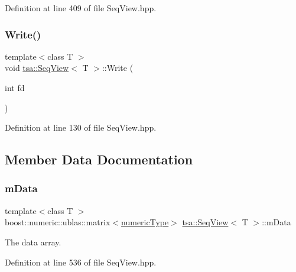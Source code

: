 Definition at line 409 of file Seq\+View.\+hpp.

\mbox{\label{classtsa_1_1_seq_view_a018ca56daa37e8b8ae58c8cc978ddc9b}} 
\subsubsection{\texorpdfstring{Write()}{Write()}}
{\footnotesize\ttfamily template$<$class T $>$ \\
void \hyperlink{classtsa_1_1_seq_view}{tsa\+::\+Seq\+View}$<$ T $>$\+::Write (\begin{DoxyParamCaption}\item[{int}]{fd }\end{DoxyParamCaption})\hspace{0.3cm}{\ttfamily [inline]}}



Definition at line 130 of file Seq\+View.\+hpp.



\subsection{Member Data Documentation}
\mbox{\label{classtsa_1_1_seq_view_a7534776ab98f82620fd02d021309251a}} 
\subsubsection{\texorpdfstring{m\+Data}{mData}}
{\footnotesize\ttfamily template$<$class T $>$ \\
boost\+::numeric\+::ublas\+::matrix$<$\hyperlink{classtsa_1_1_seq_view_a72b689db78d0feea3305e62cc3852a1d}{numeric\+Type}$>$ \hyperlink{classtsa_1_1_seq_view}{tsa\+::\+Seq\+View}$<$ T $>$\+::m\+Data\hspace{0.3cm}{\ttfamily [protected]}}



The data array. 



Definition at line 536 of file Seq\+View.\+hpp.

\mbox{\label{classtsa_1_1_seq_view_a824069f8c77d6971304be1005244e490}} 
